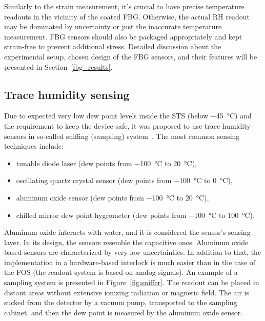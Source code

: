 Similarly to the strain measurement, it’s crucial to have precise temperature readouts in the vicinity of the coated \gls{FBG}. Otherwise, the actual RH readout may be dominated by uncertainty or just the inaccurate temperature measurement. \gls{FBG} sensors should also be packaged appropriately and kept strain-free to prevent additional stress. Detailed discussion about the experimental setup, chosen design of the \gls{FBG} sensors, and their features will be presented in Section~\ref{fbg_results}.



\subsection{Trace humidity sensing}

Due to expected very low dew point levels inside the \gls{STS} (below \SI{-45}{\celsius}) and the requirement to keep the device safe, it was proposed to use trace humidity sensors in so-called sniffing (sampling) system~\cite{Berruti}. The most common sensing techniques include:
\begin{itemize}
    \item tunable diode laser (dew points from \SI{-100}{\celsius} to \SI{20}{\celsius}),
    \item oscillating quartz crystal sensor (dew points from \SI{-100}{\celsius} to \SI{0}{\celsius}),
    \item aluminum oxide sensor (dew points from \SI{-100}{\celsius} to \SI{20}{\celsius}),
    \item chilled mirror dew point hygrometer  (dew points from \SI{-100}{\celsius} to \SI{100}{\celsius}).
\end{itemize}

Aluminum oxide interacts with water, and it is considered the sensor's sensing layer. In its design, the sensors resemble the capacitive ones. Aluminum oxide based sensors are characterized by very low uncertainties. In addition to that, the implementation in a hardware-based interlock is much easier than in the case of the \gls{FOS} (the readout system is based on analog signals). An example of a sampling system is presented in Figure~\ref{fig:sniffer}. The readout can be placed in distant areas without extensive ionizing radiation or magnetic field. The air is sucked from the detector by a vacuum pump, transported to the sampling cabinet, and then the dew point is measured by the aluminum oxide sensor.  

